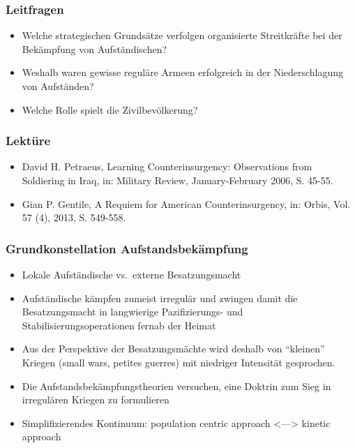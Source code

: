 {}\documentclass[a4paper]{article}
\providecommand{\tightlist}{\setlength{\itemsep}{1mm}\setlength{\parskip}{1mm}}
\begin{document}
\subsubsection{Leitfragen}\label{leitfragen-5}

\begin{itemize}
	\tightlist
	\item
	      Welche strategischen Grundsätze verfolgen organisierte Streitkräfte
	      bei der Bekämpfung von Aufständischen?
	\item
	      Weshalb waren gewisse reguläre Armeen erfolgreich in der
	      Niederschlagung von Aufständen?
	\item
	      Welche Rolle spielt die Zivilbevölkerung?
\end{itemize}

\subsubsection{Lektüre}\label{lektuxfcre-5}

\begin{itemize}
	\tightlist
	\item
	      David H. Petraeus, Learning Counterinsurgency: Observations from
	      Soldiering in Iraq, in: Military Review, January-February 2006, S.
	      45-55.
	\item
	      Gian P. Gentile, A Requiem for American Counterinsurgency, in: Orbis,
	      Vol. 57 (4), 2013, S. 549-558.
\end{itemize}

\subsubsection{Grundkonstellation
	Aufstandsbekämpfung}\label{grundkonstellation-aufstandsbekuxe4mpfung}

\begin{itemize}
	\tightlist
	\item
	      Lokale Aufständische vs.~externe Besatzungsmacht
	\item
	      Aufständische kämpfen zumeist irregulär und zwingen damit die
	      Besatzungsmacht in langwierige Pazifizierungs- und
	      Stabilisierungsoperationen fernab der Heimat
	\item
	      Aus der Perspektive der Besatzungsmächte wird deshalb von ``kleinen''
	      Kriegen (small wars, petites guerres) mit niedriger Intensität
	      gesprochen.
	\item
	      Die Aufstandsbekämpfungstheorien versuchen, eine Doktrin zum Sieg in
	      irregulären Kriegen zu formulieren
	\item
	      Simplifizierendes Kontinuum: population centric approach
	      \textless---\textgreater{} kinetic approach
\end{itemize}
\end{document}
